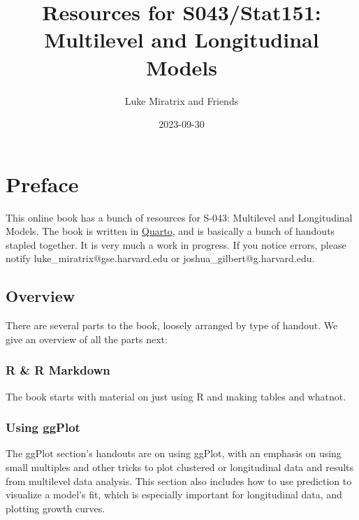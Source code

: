 \documentclass[
  letterpaper,
  DIV=11,
  numbers=noendperiod]{scrreprt}
\title{Resources for S043/Stat151: Multilevel and Longitudinal Models}
\author{Luke Miratrix and Friends}
\date{2023-09-30}
\renewcommand*\contentsname{Table of contents}
\newcommand\contentsname{Table of contents}
\begin{document}
\maketitle
\renewcommand*\contentsname{Table of contents}
{
\hypersetup{linkcolor=}
\setcounter{tocdepth}{2}
\tableofcontents
}

\hypertarget{preface}{%
\chapter*{Preface}\label{preface}}


This online book has a bunch of resources for S-043: Multilevel and
Longitudinal Models. The book is written in
\href{https://quarto.org/}{Quarto}, and is basically a bunch of handouts
stapled together. It is very much a work in progress. If you notice
errors, please notify luke\_miratrix@gse.harvard.edu or
joshua\_gilbert@g.harvard.edu.

\hypertarget{overview}{%
\section*{Overview}\label{overview}}


There are several parts to the book, loosely arranged by type of
handout. We give an overview of all the parts next:

\hypertarget{r-r-markdown}{%
\subsection*{R \& R Markdown}\label{r-r-markdown}}

The book starts with material on just using R and making tables and
whatnot.

\hypertarget{using-ggplot}{%
\subsection*{Using ggPlot}\label{using-ggplot}}

The ggPlot section's handouts are on using ggPlot, with an emphasis on
using small multiples and other tricks to plot clustered or longitudinal
data and results from multilevel data analysis. This section also
includes how to use prediction to visualize a model's fit, which is
especially important for longitudinal data, and plotting growth curves.
\end{document}
